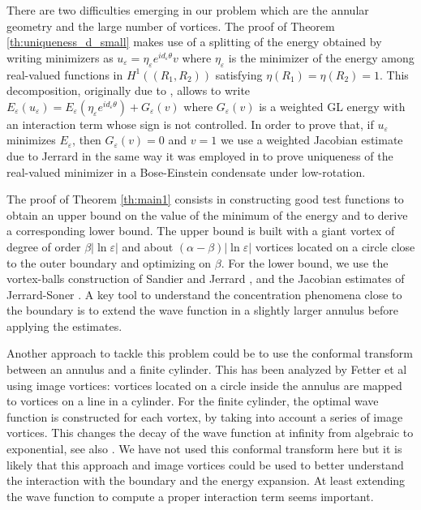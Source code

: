 \documentclass[12pt,reqno]{amsart}
\def\e {{\varepsilon}}
\numberwithin{equation}{section}
\begin{document}
There are two difficulties emerging in our problem which are the annular geometry and the large number of vortices. The proof of Theorem \ref{th:uniqueness_d_small} makes use of a splitting of the energy obtained by writing minimizers as \(u_\e=\eta_\e e^{id_\e\theta}v\) where \(\eta_\e\) is the minimizer of the energy %
 among real-valued functions in \(H^1( (R_1,R_2))\) satisfying \(\eta(R_1)=\eta(R_2)=1\). This decomposition, originally due to \cite{Lassoued_Mironescu_1999}, allows to write \(E_\e(u_\e)=E_\e(\eta_\e e^{id_\e\theta})+G_\e(v)\) where \(G_\e(v)\) is a weighted GL energy with an interaction term whose sign is not controlled. In order to prove that, if \(u_\e\) minimizes \(E_\e\), then \(G_\e(v)=0\) and \(v=1\) we use a weighted Jacobian estimate due to Jerrard \cite{Jerrard_2007} in the same way it was employed in \cite{Aftalion_Jerrard_RoyoLetelier_2011} to prove uniqueness of the real-valued minimizer in a Bose-Einstein condensate under low-rotation. 

 The proof of Theorem \ref{th:main1} consists in constructing good test functions to obtain an upper bound on the value of the minimum of the energy and to derive a corresponding lower bound. The upper bound is built with a giant vortex of degree of order $ \beta|\ln \e| $ and about $ (\alpha -\beta) |\ln \e|$ vortices located on a circle close to the outer boundary and optimizing on $\beta$. For the lower bound, we use the vortex-balls construction of Sandier \cite{Sandier_1998} and Jerrard \cite{Jerrard_1999}, and the Jacobian estimates of Jerrard-Soner \cite{Jerrard_Soner_2002}. A key tool to understand the concentration phenomena close to the boundary is to extend the wave function in a slightly larger annulus before applying the estimates.

Another approach to tackle this problem could be to use the conformal transform between an annulus and a finite cylinder. This has been analyzed by Fetter et al \cite{fetter67,Guenther_Massignan_Fetter_2017} using image vortices: vortices located on a circle inside the annulus are mapped to vortices on a line in a cylinder. For the
finite cylinder, the optimal wave function is constructed for each vortex, by taking into
account a series of image vortices. This changes the decay of the wave function at
infinity from algebraic to exponential, see also \cite{aftsan}. 
 We have not used this conformal transform here but it is likely that this approach and image vortices could be used to better understand the interaction with the boundary and the energy expansion. At least extending the wave function to compute a proper
interaction term seems important.
\end{document}
